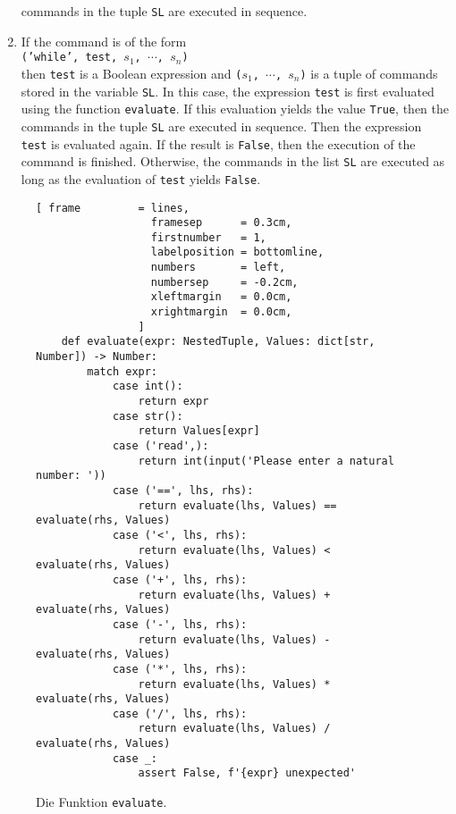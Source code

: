 \begin{enumerate}
      commands in the tuple \texttt{SL} are executed in sequence.
\item If the command is of the form
      \\[0.2cm]
      \hspace*{1.3cm}
      \texttt{('while', test, $s_1$, $\cdots$, $s_n$)}
      \\[0.2cm]
      then \texttt{test} is a Boolean expression and \texttt{($s_1$, $\cdots$, $s_n$)}
      is a tuple of commands stored in the variable \texttt{SL}.
      In this case, the expression \texttt{test} is first evaluated using the function \texttt{evaluate}.
      If this evaluation yields the value \texttt{True}, then the
      commands in the tuple \texttt{SL} are executed in sequence.
      Then the expression \texttt{test} is evaluated again. If the result is
      \texttt{False}, then the execution of the command is finished. Otherwise,
      the commands in the list \texttt{SL} are executed as long as the evaluation of \texttt{test}
      yields \texttt{False}.
\end{enumerate}


\begin{figure}[!ht]
\centering
\begin{Verbatim}[ frame         = lines, 
                  framesep      = 0.3cm, 
                  firstnumber   = 1,
                  labelposition = bottomline,
                  numbers       = left,
                  numbersep     = -0.2cm,
                  xleftmargin   = 0.0cm,
                  xrightmargin  = 0.0cm,
                ]
    def evaluate(expr: NestedTuple, Values: dict[str, Number]) -> Number:
        match expr:
            case int():
                return expr
            case str():
                return Values[expr] 
            case ('read',):
                return int(input('Please enter a natural number: '))
            case ('==', lhs, rhs):
                return evaluate(lhs, Values) == evaluate(rhs, Values)
            case ('<', lhs, rhs):
                return evaluate(lhs, Values) < evaluate(rhs, Values)
            case ('+', lhs, rhs):
                return evaluate(lhs, Values) + evaluate(rhs, Values)
            case ('-', lhs, rhs):
                return evaluate(lhs, Values) - evaluate(rhs, Values)
            case ('*', lhs, rhs):
                return evaluate(lhs, Values) * evaluate(rhs, Values)
            case ('/', lhs, rhs):
                return evaluate(lhs, Values) / evaluate(rhs, Values)
            case _:
                assert False, f'{expr} unexpected'
\end{Verbatim}
\vspace*{-0.3cm}
\caption{Die Funktion \texttt{evaluate}.}
\label{fig:Interpreter.ipynb:evaluate}
\end{figure}
\FloatBarrier

